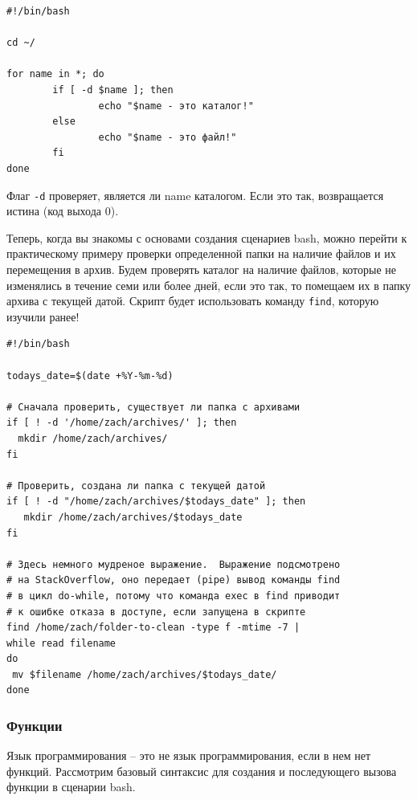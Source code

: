 \documentclass[12pt]{article}
\begin{document}
\begin{verbatim}
#!/bin/bash

cd ~/

for name in *; do
        if [ -d $name ]; then
                echo "$name - это каталог!"
        else
                echo "$name - это файл!"
        fi
done
\end{verbatim}

Флаг \texttt{-d} проверяет, является ли name каталогом. Если это так,
возвращается истина (код выхода 0).

Теперь, когда вы знакомы с основами создания сценариев bash, можно
перейти к практическому примеру проверки определенной папки на наличие
файлов и их перемещения в архив. Будем проверять каталог на наличие
файлов, которые не изменялись в течение семи или более дней, если это
так, то помещаем их в папку архива с текущей датой. Скрипт будет
использовать команду \texttt{find}, которую изучили ранее!

\begin{verbatim}
#!/bin/bash

todays_date=$(date +%Y-%m-%d)

# Сначала проверить, существует ли папка с архивами
if [ ! -d '/home/zach/archives/' ]; then
  mkdir /home/zach/archives/
fi

# Проверить, создана ли папка с текущей датой
if [ ! -d "/home/zach/archives/$todays_date" ]; then
   mkdir /home/zach/archives/$todays_date
fi

# Здесь немного мудреное выражение.  Выражение подсмотрено
# на StackOverflow, оно передает (pipe) вывод команды find
# в цикл do-while, потому что команда exec в find приводит
# к ошибке отказа в доступе, если запущена в скрипте
find /home/zach/folder-to-clean -type f -mtime -7 |
while read filename
do
 mv $filename /home/zach/archives/$todays_date/
done
\end{verbatim}

\hypertarget{Functions}{%
\subsubsection{\texorpdfstring{\protect\hyperlink{Functions}{}Функции}{Функции}}\label{Functions}}

Язык программирования -- это не язык программирования, если в нем нет
функций. Рассмотрим базовый синтаксис для создания и последующего вызова
функции в сценарии bash.
\end{document}
